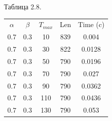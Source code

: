 \documentclass[12pt]{report}
\begin{document}
\begin{minipage}{0.5\textwidth}
\begin{center}
			Таблица 2.8.
			
			\begin{tabular}{|c c c c c|}
				\hline
				$\alpha$ & $\beta$ & $T_{max}$ & Len & Time (c) \\ [0.5ex]
				0.7 & 0.3 & 10 & 839 & 0.004 \\ 
				\hline 
				0.7 & 0.3 & 30 & 822 & 0.0128 \\ 
				\hline 
				0.7 & 0.3 & 50 & 790 & 0.0196 \\ 
				\hline 
				0.7 & 0.3 & 70 & 790 & 0.027 \\ 
				\hline 
				0.7 & 0.3 & 90 & 790 & 0.0362 \\ 
				\hline 
				0.7 & 0.3 & 110 & 790 & 0.0436 \\ 
				\hline 
				0.7 & 0.3 & 130 & 790 & 0.053 \\ 
				\hline 
			\end{tabular}
			
			
			
		\end{center}
	\end{minipage}
	
	\newpage
	
\end{document}
